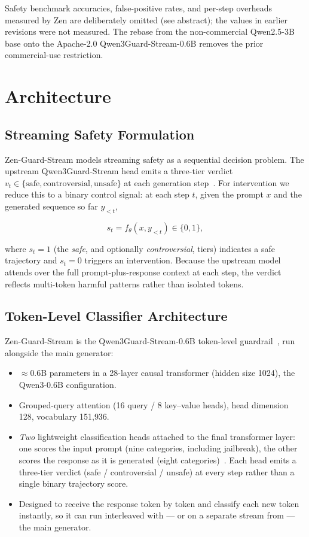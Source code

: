 \documentclass[11pt,a4paper]{article}
\begin{document}
Safety benchmark accuracies, false-positive rates, and per-step overheads measured by Zen are
deliberately omitted (see abstract); the values in earlier revisions were not measured. The
rebase from the non-commercial Qwen2.5-3B base onto the Apache-2.0 Qwen3Guard-Stream-0.6B
removes the prior commercial-use restriction.

\section{Architecture}

\subsection{Streaming Safety Formulation}
\label{sec:formulation}

Zen-Guard-Stream models streaming safety as a sequential decision problem. The upstream
Qwen3Guard-Stream head emits a three-tier verdict $v_t \in \{\text{safe},
\text{controversial}, \text{unsafe}\}$ at each generation step~\cite{qwen3guard}. For
intervention we reduce this to a binary control signal: at each step $t$, given the prompt $x$
and the generated sequence so far $y_{<t}$,

\begin{equation}
  s_t = f_\theta(x, y_{<t}) \in \{0, 1\},
\end{equation}

where $s_t = 1$ (the \emph{safe}, and optionally \emph{controversial}, tiers) indicates a safe
trajectory and $s_t = 0$ triggers an intervention. Because the upstream model attends over the
full prompt-plus-response context at each step, the verdict reflects multi-token harmful
patterns rather than isolated tokens.

\subsection{Token-Level Classifier Architecture}

Zen-Guard-Stream is the Qwen3Guard-Stream-0.6B token-level guardrail~\cite{qwen3guard}, run
alongside the main generator:

\begin{itemize}
  \item $\approx$0.6B parameters in a 28-layer causal transformer (hidden size 1024),
        the Qwen3-0.6B configuration.
  \item Grouped-query attention (16 query / 8 key--value heads), head dimension 128,
        vocabulary 151{,}936.
  \item \emph{Two} lightweight classification heads attached to the final transformer layer:
        one scores the input prompt (nine categories, including jailbreak), the other scores
        the response as it is generated (eight categories)~\cite{qwen3guard}. Each head emits a
        three-tier verdict (safe / controversial / unsafe) at every step rather than a single
        binary trajectory score.
  \item Designed to receive the response token by token and classify each new token instantly,
        so it can run interleaved with --- or on a separate stream from --- the main generator.
\end{itemize}
\end{document}
